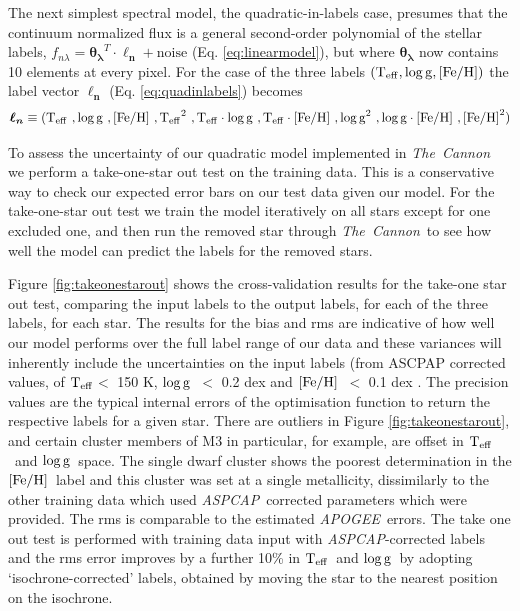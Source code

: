 \documentclass[12pt, preprint]{aastex}
\newcommand{\teff}{\mbox{$\rm T_{eff}$}}
\newcommand{\feh}{\mbox{$\rm [Fe/H]$}}
\newcommand{\logg}{\mbox{$\rm \log g$}}
\newcommand{\tc}{\textsl{The~Cannon}}
\newcommand{\apogee}{\textsl{APOGEE}}
\newcommand{\aspcap}{\textsl{ASPCAP}}
\begin{document}

The next simplest spectral model, the quadratic-in-labels case,
 presumes that the continuum normalized flux is a general second-order polynomial of the stellar labels, $f_{n\lambda} =
\boldsymbol{\theta_\lambda}^T \cdot \boldsymbol{\ell_n} + \mbox{noise}$ 
(Eq. \ref{eq:linearmodel}), 
but where $\boldsymbol{\theta_\lambda}$ now contains 10 elements at every pixel.
For the case of the three labels $(\teff , \logg , \feh)$ the label vector $\boldsymbol{\ell_n}$
(Eq. \ref{eq:quadinlabels})
becomes  
\begin{equation}
\boldsymbol{\ell_n}\equiv(\teff\  , \logg\  , \feh\  , \teff^2\ , \teff\cdot \logg\ , \teff \cdot\feh\ , \logg^2 \ , \logg\cdot \feh\  , \feh^2)
 \label{eq:quadin3labels}
 \end{equation}

To assess the uncertainty of our quadratic model implemented in \tc\, we perform a take-one-star out test on the training data. 
This is a conservative way to check our expected error bars on our test data given our model. 
For the take-one-star out test we train the model iteratively on all stars except for one excluded one, and then run the removed star through \tc\, to see how well the model can predict the labels for the removed stars. 

Figure \ref{fig:takeonestarout} shows the cross-validation results for the take-one star out test, comparing the input labels to the output labels, for each of the three labels, for each star. 
The results for the bias and rms are indicative of how well our model performs over the full label range of our data and these variances will inherently include the uncertainties on the input labels (from ASCPAP corrected values, of \teff $<$ 150 K, \logg\ $<$ 0.2 dex and \feh\ $<$ 0.1 dex \citep{Meszaros2013}. 
The precision values are the typical internal errors of the optimisation function to return the respective labels for a given star. 
There are outliers in Figure \ref{fig:takeonestarout}, and certain cluster members of M3 in particular, for example,  are offset in \teff\ and \logg\ space. 
The single dwarf cluster shows the poorest determination in the \feh\ label and this cluster was set at a single metallicity, dissimilarly to the other training data which used \aspcap\ corrected parameters which were provided. 
The rms is comparable to the estimated \apogee\ errors. The take one out test is performed with training data input with \aspcap-corrected labels and the rms error improves by a further 10\% in \teff\ and \logg\  by adopting `isochrone-corrected' labels, obtained by moving the star to the nearest position on the isochrone. 
\end{document}
